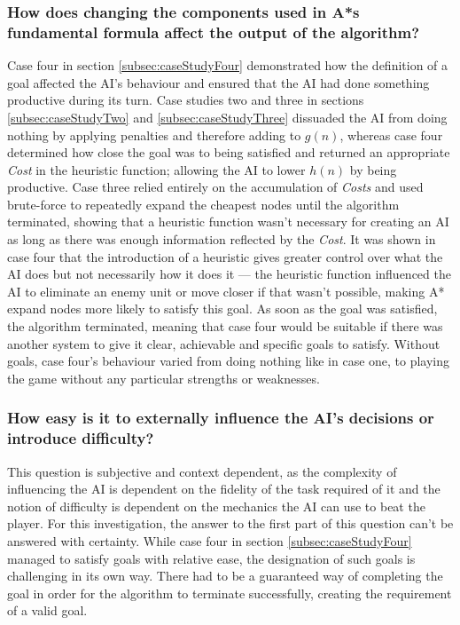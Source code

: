 \documentclass[11pt, a4paper]{report}
\begin{document}
\subsubsection{How does changing the components used in A*s fundamental formula affect the output of the algorithm?}

Case four in section \ref{subsec:caseStudyFour} demonstrated how the definition of a goal affected the AI's behaviour and ensured that the AI had done something productive during its turn. Case studies two and three in sections \ref{subsec:caseStudyTwo} and \ref{subsec:caseStudyThree} dissuaded the AI from doing nothing by applying penalties and therefore adding to $g(n)$, whereas case four determined how close the goal was to being satisfied and returned an appropriate \emph{Cost} in the heuristic function; allowing the AI to lower $h(n)$ by being productive. Case three relied entirely on the accumulation of \emph{Costs} and used brute-force to repeatedly expand the cheapest nodes until the algorithm terminated, showing that a heuristic function wasn't necessary for creating an AI as long as there was enough information reflected by the \emph{Cost}. It was shown in case four that the introduction of a heuristic gives greater control over what the AI does but not necessarily how it does it --- the heuristic function influenced the AI to eliminate an enemy unit or move closer if that wasn't possible, making A* expand nodes more likely to satisfy this goal. As soon as the goal was satisfied, the algorithm terminated, meaning that case four would be suitable if there was another system to give it clear, achievable and specific goals to satisfy. Without goals, case four's behaviour varied from doing nothing like in case one, to playing the game without any particular strengths or weaknesses.

\subsubsection{How easy is it to externally influence the AI's decisions or introduce difficulty?}

This question is subjective and context dependent, as the complexity of influencing the AI is dependent on the fidelity of the task required of it and the notion of difficulty is dependent on the mechanics the AI can use to beat the player. For this investigation, the answer to the first part of this question can't be answered with certainty. While case four in section \ref{subsec:caseStudyFour} managed to satisfy goals with relative ease, the designation of such goals is challenging in its own way. There had to be a guaranteed way of completing the goal in order for the algorithm to terminate successfully, creating the requirement of a valid goal. 
\end{document}
